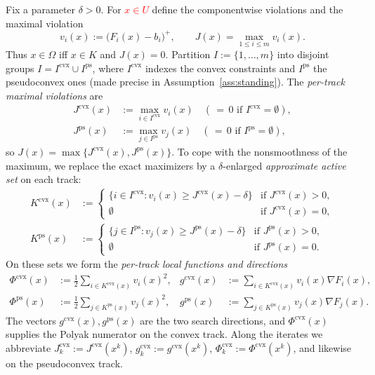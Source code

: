 \documentclass[]{interact}
\theoremstyle{plain}
\theoremstyle{definition}
\theoremstyle{remark}
\newcommand{\cvx}{\mathrm{cvx}}
\newcommand{\ps}{\mathrm{ps}}
\begin{document}
Fix a parameter $\delta>0$. For \leavevmode\textcolor{red}{$x\in U$} define the componentwise violations and the
maximal violation
\begin{equation}\label{eq:vi}
v_i(x):=\bigl(F_i(x)-b_i\bigr)^+,\qquad J(x)=\max_{1\le i\le m}v_i(x).
\end{equation}
Thus $x\in\Omega$ iff $x\in K$ and $J(x)=0$. Partition $I:=\{1,\dots,m\}$ into disjoint
groups $I=I^{\cvx}\cup I^{\ps}$, where $I^{\cvx}$ indexes the convex constraints and
$I^{\ps}$ the pseudoconvex ones (made precise in Assumption~\ref{ass:standing}). The
\emph{per-track maximal violations} are
\begin{align}
J^{\cvx}(x)&:=\max_{i\in I^{\cvx}}v_i(x)\quad(\,{=}\,0\text{ if }I^{\cvx}=\emptyset),\label{eq:Jcvx}\\
J^{\ps}(x)&:=\max_{j\in I^{\ps}}v_j(x)\quad(\,{=}\,0\text{ if }I^{\ps}=\emptyset),\label{eq:Jps}
\end{align}
so $J(x)=\max\{J^{\cvx}(x),J^{\ps}(x)\}$. To cope with the nonsmoothness of the maximum,
we replace the exact maximizers by a $\delta$-enlarged \emph{approximate active
set} on each track:
\begin{align}
K^{\cvx}(x)&:=\begin{cases}\{i\in I^{\cvx}:v_i(x)\ge J^{\cvx}(x)-\delta\} & \text{if }J^{\cvx}(x)>0,\\ \emptyset & \text{if }J^{\cvx}(x)=0,\end{cases}\label{eq:Kcvx}\\[2pt]
K^{\ps}(x)&:=\begin{cases}\{j\in I^{\ps}:v_j(x)\ge J^{\ps}(x)-\delta\} & \text{if }J^{\ps}(x)>0,\\ \emptyset & \text{if }J^{\ps}(x)=0.\end{cases}\label{eq:Kps}
\end{align}
On these sets we form the \emph{per-track local functions and directions}
\begin{align}
\Phi^{\cvx}(x)&:=\tfrac12\!\!\sum_{i\in K^{\cvx}(x)}\!\! v_i(x)^2, & g^{\cvx}(x)&:=\!\!\sum_{i\in K^{\cvx}(x)}\!\! v_i(x)\nabla F_i(x),\label{eq:phi-g-cvx}\\
\Phi^{\ps}(x)&:=\tfrac12\!\!\sum_{j\in K^{\ps}(x)}\!\! v_j(x)^2, & g^{\ps}(x)&:=\!\!\sum_{j\in K^{\ps}(x)}\!\! v_j(x)\nabla F_j(x).\label{eq:phi-g-ps}
\end{align}
The vectors $g^{\cvx}(x),g^{\ps}(x)$ are the two search directions, and $\Phi^{\cvx}(x)$
supplies the Polyak numerator on the convex track. Along the iterates we abbreviate
$J^{\cvx}_k:=J^{\cvx}(x^k)$, $g^{\cvx}_k:=g^{\cvx}(x^k)$, $\Phi^{\cvx}_k:=\Phi^{\cvx}(x^k)$,
and likewise on the pseudoconvex track.
\end{document}
